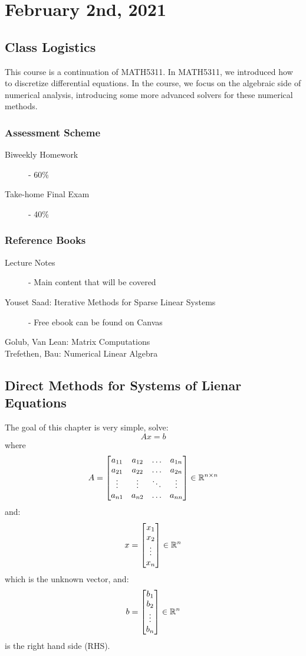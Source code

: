 \documentclass[../main/main.tex]{subfiles}
\begin{document}
\section{February 2nd, 2021}
\subsection{Class Logistics}
This course is a continuation of MATH5311. In MATH5311, we introduced how to discretize differential equations.
In the course, we focus on the algebraic side of numerical analysis, introducing some more advanced solvers for these numerical methods.

\subsubsection{Assessment Scheme}
\begin{description}
  \item[Biweekly Homework] - 60\%
  \item[Take-home Final Exam] - 40\%
\end{description}
\subsubsection{Reference Books}
\begin{description}
  \item[Lecture Notes] - Main content that will be covered
  \item[Youset Saad: Iterative Methods for Sparse Linear Systems] - Free ebook can be found on Canvas
  \item[Golub, Van Lean: Matrix Computations]
  \item[Trefethen, Bau: Numerical Linear Algebra]
\end{description}

\subsection{Direct Methods for Systems of Lienar Equations}
The goal of this chapter is very simple, solve: \[
Ax = b
\] where \[
A = \begin{bmatrix}
  a_{11} & a_{12} & \ldots & a_{1n}\\
  a_{21} & a_{22} & \ldots & a_{2n}\\
  \vdots & \vdots & \ddots &\vdots \\
  a_{n1} & a_{n2} & \ldots & a_{nn}\\
\end{bmatrix} \in \mathbb{R}^{n \times n}
\]
and: \[
x = \begin{bmatrix}
  x_1\\ x_2 \\ \vdots \\x_{n}
\end{bmatrix} \in \mathbb{R}^{n}
\] which is the unknown vector, and: \[
b = \begin{bmatrix}
  b_1\\ b_2 \\ \vdots \\b_{n}
\end{bmatrix} \in \mathbb{R}^{n}
\] is the right hand side (RHS).
\end{document}
